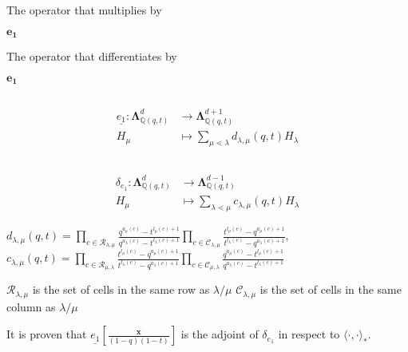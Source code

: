 \documentclass[12pt]{amsart}
\begin{document}
\vspace{-10pt}
\begin{mdframed}[linecolor=red!20,linewidth=3pt,innertopmargin=8pt]
	\begin{bf}The operator that multiplies by \end{bf}$\bm{e_1}$\hspace{75pt}\begin{bf}The operator that differentiates by \end{bf}$\bm{e_1}$

	\begin{minipage}[t]{.5cm}
		\begin{equation}
		\end{equation}
	\end{minipage}
	\begin{minipage}[t]{9cm}
		\begin{align*} \underline{e_1}:\mathbf{\Lambda}^d_{\mathbb{Q}(q,t)} &\rightarrow \mathbf{\Lambda}_{\mathbb{Q}(q,t)}^{d+1}
		\\				H_\mu &\mapsto \sum_{\mu \lessdot \lambda}d_{\lambda,\mu}(q,t) H_\lambda 
		\end{align*}
	\end{minipage}
	\begin{minipage}[t]{.5cm}
		\begin{equation}
		\end{equation}
	\end{minipage}
	\begin{minipage}[t]{9cm}
		\begin{align*} \delta_{e_1}:\mathbf{\Lambda}^d_{\mathbb{Q}(q,t)} &\rightarrow \mathbf{\Lambda}_{\mathbb{Q}(q,t)}^{d-1}
		\\				H_\mu &\mapsto\sum_{\lambda \lessdot \mu}c_{\lambda,\mu}(q,t) H_\lambda
		\end{align*}
	\end{minipage}

	$d_{\lambda,\mu}(q,t)=\prod_{c\in \mathcal{R}_{\lambda,\mu}}\frac{q^{a_\mu(c)}-t^{l_\mu(c)+1}}{q^{a_\lambda(c)}-t^{l_\lambda(c)	+1}}\prod_{c\in \mathcal{C}_{\lambda,\mu}}\frac{t^{l_\mu(c)}-q^{a_\mu(c)+1}}{t^{l_\lambda(c)}-q^{a_\lambda(c)+1}}
	$, $c_{\lambda,\mu}(q,t)=\prod_{c\in \mathcal{R}_{\mu,\lambda}}\frac{t^{l_\mu(c)}-q^{a_\mu(c)+1}}{t^{l_\lambda(c)}-q^{a_\lambda(c)+1}}\prod_{c\in \mathcal{C}_{\mu,\lambda}}\frac{q^{a_\mu(c)}-t^{l_\mu(c)+1}}{q^{a_\lambda(c)}-t^{l_\lambda(c)+1}}$

	$\mathcal{R}_{\lambda,\mu}$ is the set of cells in the same row as $\lambda/\mu$\hspace{30pt} $\mathcal{C}_{\lambda,\mu}$ is the set of cells in the same column as $\lambda/\mu$

	It is proven that $\underline{e_1}\left[\frac{\bm{x}}{(1-q)(1-t)}\right]$ is the adjoint of $\delta_{e_1}$ in respect to $\langle\cdot,\cdot\rangle_*$.
\end{mdframed}
\end{document}
